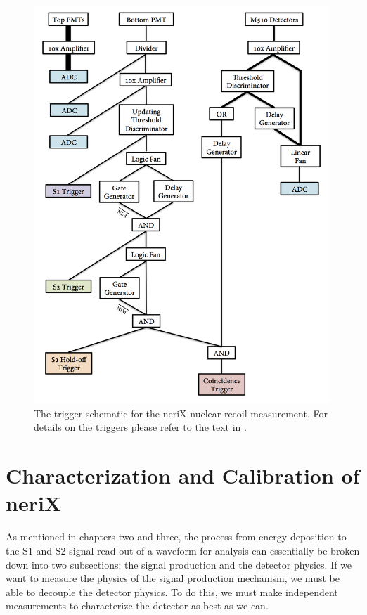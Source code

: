 \begin{figure}[p]
        \centering
	\includegraphics[width=0.99\textwidth]{nerix_daq_trigger_setup}
	\caption{The trigger schematic for the neriX nuclear recoil measurement.  For details on the triggers please refer to the text in .}
	\label{fig:nerix_daq_trigger_setup}
\end{figure}

\section{Characterization and Calibration of neriX}
\label{sec:nerix_cals}

As mentioned in chapters two and three, the process from energy deposition to the S1 and S2 signal read out of a waveform for analysis can essentially be broken down into two subsections: the signal production and the detector physics.  If we want to measure the physics of the signal production mechanism, we must be able to decouple the detector physics.  To do this, we must make independent measurements to characterize the detector as best as we can.  

